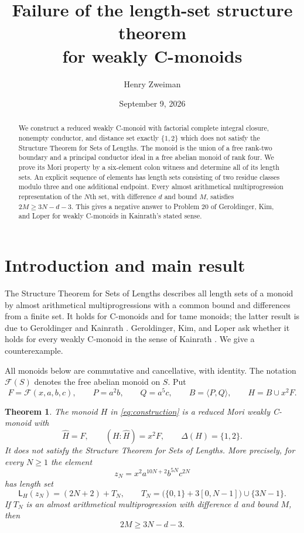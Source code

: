 \documentclass[11pt]{article}
\title{Failure of the length-set structure theorem\protect\\for weakly C-monoids}
\author{Henry Zweiman}
\date{September 9, 2026}
\newtheorem{theorem}{Theorem}[section]
\theoremstyle{definition}
\newcommand{\F}{\mathcal F}
\newcommand{\LL}{\mathsf L}
\begin{document}
\maketitle
\begin{abstract}
We construct a reduced weakly C-monoid with factorial complete integral closure, nonempty conductor, and distance set exactly $\{1,2\}$ which does not satisfy the Structure Theorem for Sets of Lengths. The monoid is the union of a free rank-two boundary and a principal conductor ideal in a free abelian monoid of rank four. We prove its Mori property by a six-element colon witness and determine all of its length sets. An explicit sequence of elements has length sets consisting of two residue classes modulo three and one additional endpoint. Every almost arithmetical multiprogression representation of the $N$th set, with difference $d$ and bound $M$, satisfies $2M\geq3N-d-3$. This gives a negative answer to Problem 20 of Geroldinger, Kim, and Loper for weakly C-monoids in Kainrath's stated sense.
\end{abstract}

\section{Introduction and main result}

The Structure Theorem for Sets of Lengths describes all length sets of a monoid by almost arithmetical multiprogressions with a common bound and differences from a finite set. It holds for C-monoids and for tame monoids; the latter result is due to Geroldinger and Kainrath \cite{GK}. Geroldinger, Kim, and Loper ask whether it holds for every weakly C-monoid in the sense of Kainrath \cite[Problem 20]{GKL}. We give a counterexample.

All monoids below are commutative and cancellative, with identity. The notation $\F(S)$ denotes the free abelian monoid on $S$. Put
\begin{equation}\label{eq:construction}
 F=\F(x,a,b,c),\qquad P=a^2b,\qquad Q=a^5c,\qquad
 B=\langle P,Q\rangle,\qquad H=B\cup x^2F.
\end{equation}

\begin{theorem}\label{thm:main}
The monoid $H$ in \eqref{eq:construction} is a reduced Mori weakly C-monoid with
\[
 \widehat H=F,\qquad (H:\widehat H)=x^2F,\qquad \Delta(H)=\{1,2\}.
\]
It does not satisfy the Structure Theorem for Sets of Lengths. More precisely, for every $N\geq1$ the element
\[
 z_N=x^2a^{10N+2}b^{5N}c^{2N}
\]
has length set
\begin{equation}\label{eq:ray}
 \LL_H(z_N)=(2N+2)+T_N,\qquad
 T_N=\bigl(\{0,1\}+3[0,N-1]\bigr)\cup\{3N-1\}.
\end{equation}
If $T_N$ is an almost arithmetical multiprogression with difference $d$ and bound $M$, then
\begin{equation}\label{eq:lower-bound}
 2M\geq3N-d-3.
\end{equation}
\end{theorem}
\end{document}
